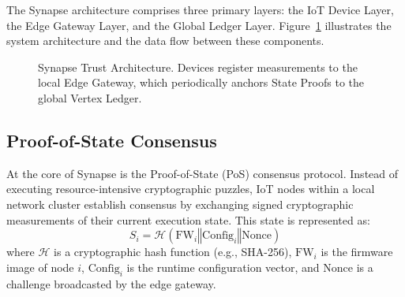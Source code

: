 The Synapse architecture comprises three primary layers: the IoT Device Layer, the Edge Gateway Layer, and the Global Ledger Layer. Figure~\ref{fig:arch} illustrates the system architecture and the data flow between these components.

\begin{figure}[t]
  \centering
  \caption{Synapse Trust Architecture. Devices register measurements to the local Edge Gateway, which periodically anchors State Proofs to the global Vertex Ledger.}
  \label{fig:arch}
\end{figure}

\subsection{Proof-of-State Consensus}
At the core of Synapse is the Proof-of-State (PoS) consensus protocol. Instead of executing resource-intensive cryptographic puzzles, IoT nodes within a local network cluster establish consensus by exchanging signed cryptographic measurements of their current execution state. This state is represented as:
\begin{equation}
    S_i = \mathcal{H}(\text{FW}_i \mathbin{\Vert} \text{Config}_i \mathbin{\Vert} \text{Nonce})
\end{equation}
where $\mathcal{H}$ is a cryptographic hash function (e.g., SHA-256), $\text{FW}_i$ is the firmware image of node $i$, $\text{Config}_i$ is the runtime configuration vector, and $\text{Nonce}$ is a challenge broadcasted by the edge gateway.

